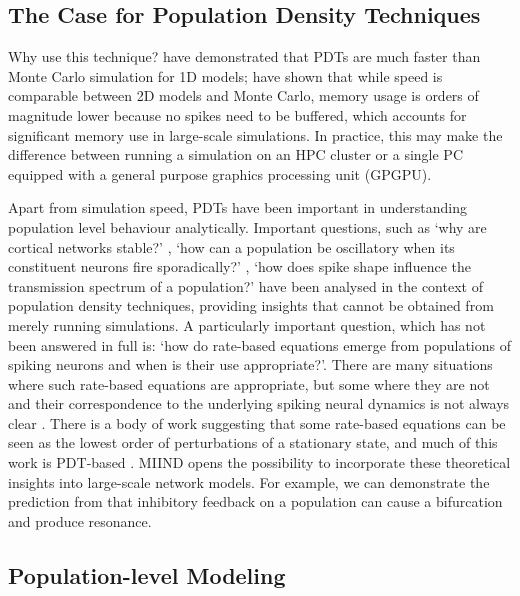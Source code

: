 \documentclass[utf8]{frontiersSCNS} %
\begin{document}
\subsection{The Case for Population Density Techniques} 
Why use this technique?
\cite{omurtag2000,nykamp2000population,kamps2003simple,iyer2013influence} have demonstrated that PDTs are much faster than Monte Carlo simulation for 1D models; \cite{de2019computational} have shown that while speed is comparable between 2D models and Monte Carlo, memory usage is orders of magnitude lower because no spikes need to be buffered, which accounts for significant memory use in large-scale simulations. In practice, this may make the difference between running a simulation on an HPC cluster or a single PC equipped with a general purpose graphics processing unit (GPGPU).

Apart from simulation speed, PDTs have been important in understanding population level behaviour analytically. Important questions, such as `why are cortical networks stable?' \citep{amit1997model}, `how can a population be oscillatory when its constituent neurons fire sporadically?'
\citep{brunel1999fast}, `how does spike shape influence the transmission spectrum of a population?'\citep{fourcaud2003spike} have been analysed in the context of population density techniques, providing insights that cannot be obtained from merely running simulations. A particularly important question, which has not been answered in full is: `how do rate-based equations emerge from populations of spiking neurons and when is their use appropriate?'. There are many situations where such rate-based equations are appropriate, but some where they are not and their correspondence to the underlying spiking neural dynamics is not always clear \citep{montbrio2015macroscopic,de2013generic}. There is a body of work suggesting that some rate-based equations can be seen as the lowest order of perturbations of a stationary state, and much of this work is PDT-based \citep{wilson1972excitatory,gerstner1998spiking,mattia2002population,mattia2004finite,montbrio2015macroscopic}. MIIND opens the possibility to incorporate these theoretical insights into large-scale network models. For example, we can demonstrate the prediction from \cite{brunel1999fast} that inhibitory feedback on a population can cause a bifurcation and produce resonance.\\

\subsection{Population-level Modeling}
\end{document}
